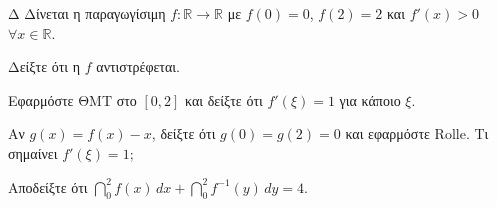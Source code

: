 \begin{thema}{Δ}
Δίνεται η παραγωγίσιμη $f:\mathbb{R}\to\mathbb{R}$ με $f(0)=0$, $f(2)=2$ και $f'(x) > 0$ $\forall x\in\mathbb{R}$.
\begin{erwthma}
    \item Δείξτε ότι η $f$ αντιστρέφεται. 
    \item Εφαρμόστε ΘΜΤ στο $[0,2]$ και δείξτε ότι $f'(\xi) = 1$ για κάποιο $\xi$. 
    \item Αν $g(x) = f(x) - x$, δείξτε ότι $g(0)=g(2)=0$ και εφαρμόστε Rolle. Τι σημαίνει $f'(\xi)=1$; 
    \item Αποδείξτε ότι $\dint_0^2 f(x)\,dx + \dint_0^2 f^{-1}(y)\,dy = 4$. 
\end{erwthma}
\end{thema}
